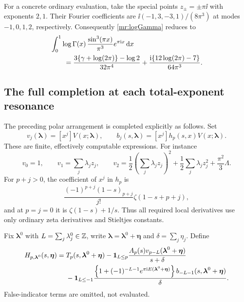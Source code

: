 For a concrete ordinary evaluation, take the special points
$z_\pm=\pm\pi\ii$ with exponents $2,1$. Their Fourier coefficients are
$\ii(-1,3,-3,1)/(8\pi^3)$ at modes $-1,0,1,2$, respectively.
Consequently \eqref{mr:logGamma} reduces to
\begin{align}
 &\int_0^1\log\Gamma(x)\,
           \frac{\sin^3(\pi x)}{\pi^3}e^{\pi\mathrm i x}\,\mathrm d x\notag\\
 &\qquad=
 \frac{3\{\gamma+\log(2\pi)\}-\log2}{32\pi^4}
       +\frac{\mathrm i\{12\log(2\pi)-7\}}{64\pi^3}.
       \label{mr:loggammaexample}
\end{align}

\subsection{The full completion at each total-exponent resonance}

The preceding polar arrangement is completed explicitly as follows.
Set
\begin{equation}\label{mr:vandb}
 v_j(\boldsymbol\lambda)=[x^j]V(x;\boldsymbol\lambda),\qquad
 b_j(s,\boldsymbol\lambda)=[x^j]h_p(s,x)V(x;\boldsymbol\lambda).
\end{equation}
These are finite, effectively computable expressions. For instance
\[
 v_0=1,\qquad v_1=\sum_j\lambda_jz_j,\qquad
 v_2=\frac12\left(\sum_j\lambda_jz_j\right)^2
       +\frac12\sum_j\lambda_jz_j^2+\frac{\pi^2}3\Lambda.
\]
For $p+j>0$, the coefficient of $x^j$ in $h_p$ is
\[
 \frac{(-1)^{p+j}(1-s)_{p+j}}{j!}\zeta(1-s+p+j),
\]
and at $p=j=0$ it is $\zeta(1-s)+1/s$. Thus all required local
derivatives use only ordinary zeta derivatives and Stieltjes constants.

Fix $\boldsymbol\lambda^0$ with
$L=\sum_j\lambda_j^0\in\mathbb Z$, write
$\boldsymbol\lambda=\boldsymbol\lambda^0+\boldsymbol\eta$ and
$\delta=\sum_j\eta_j$. Define
\begin{align}
 H_{p,\boldsymbol\lambda^0}(s,\boldsymbol\eta)
 ={}&T_p(s,\boldsymbol\lambda^0+\boldsymbol\eta)
 -\mathbf1_{L\le p}\frac{A_p(s)v_{p-L}(\boldsymbol\lambda^0+\boldsymbol\eta)}
                                  {s+\delta}\notag\\
 &-\mathbf1_{L\le-1}
 \frac{\left\{1+(-1)^{-L-1}e^{\pi\mathrm i E(\boldsymbol\lambda^0+\boldsymbol\eta)}\right\}
       b_{-L-1}(s,\boldsymbol\lambda^0+\boldsymbol\eta)}{\delta}.
       \label{mr:H}
\end{align}
False-indicator terms are omitted, not evaluated.

